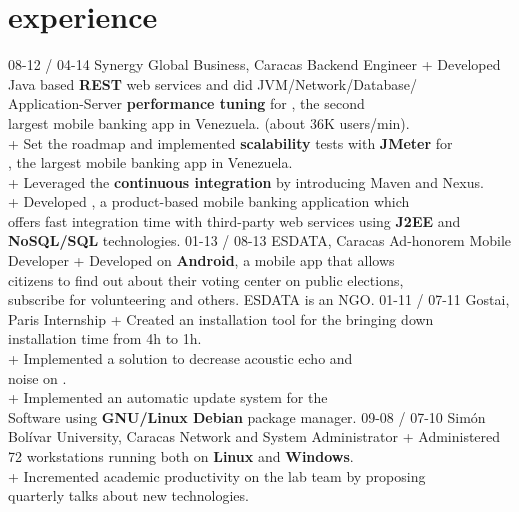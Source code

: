 \documentclass[]{friggeri-cv}
\begin{document}
\section{experience}

\begin{entrylist}
  \entry
    {\small 08-12 / 04-14}
    {Synergy Global Business, Caracas}
    {Backend Engineer}
    {+ Developed Java based \textbf{REST} web services and did JVM/Network/Database/\\
        Application-Server \textbf{performance tuning} for , the second\\
        largest mobile banking app in Venezuela. (about 36K users/min).\\
     + Set the roadmap and implemented \textbf{scalability} tests with \textbf{JMeter} for\\
         , the largest mobile banking app in Venezuela.\\
     + Leveraged the \textbf{continuous integration} by introducing Maven and Nexus.\\
     + Developed , a product-based mobile banking application which\\ 
        offers fast integration time with third-party web services using \textbf{J2EE} and\\
        \textbf{NoSQL/SQL} technologies.}
  \entry
    {\small 01-13 / 08-13}
    {ESDATA, Caracas}
    {Ad-honorem Mobile Developer}
    {+ Developed  on \textbf{Android}, a mobile app that allows\\
         citizens to ﬁnd out about their voting center on public elections,\\
         subscribe for volunteering and others. ESDATA is an NGO.}
  \entry
    {\small 01-11 / 07-11}
    {Gostai, Paris}
    {Internship}
    {+ Created an installation tool for the  bringing down\\
          installation time from 4h to 1h.\\
      + Implemented a solution to decrease acoustic echo and\\
          noise on .\\
      + Implemented an automatic update system for the\\
           Software using \textbf{GNU/Linux Debian} package manager.}
  \entry
    {\small 09-08 / 07-10}
    {Simón Bolívar University, Caracas}
    {Network and System Administrator}
    {+ Administered 72 workstations running both on \textbf{Linux} and \textbf{Windows}.\\
     + Incremented academic productivity on the lab team by proposing\\
         quarterly talks about new technologies.}
\end{entrylist}
\end{document}

